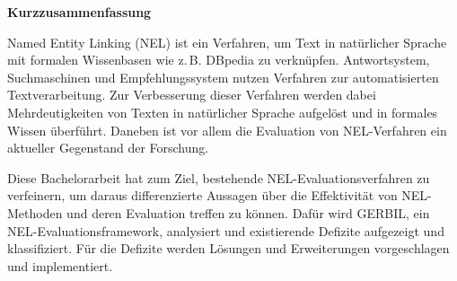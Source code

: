\documentclass[11pt, a4paper]{article}
\begin{document}
\begin{center}
{\bf Kurzzusammenfassung}
\end{center}
\noindent
Named Entity Linking (NEL) ist ein Verfahren, um Text in natürlicher Sprache mit formalen Wissenbasen wie z.\,B. DBpedia 
zu verknüpfen. Antwortsystem, Suchmaschinen und Empfehlungssystem nutzen Verfahren zur automatisierten Textverarbeitung.
Zur Verbesserung dieser Verfahren werden dabei Mehrdeutigkeiten von Texten in natürlicher Sprache aufgelöst und in formales
Wissen überführt.
Daneben ist vor allem die Evaluation von NEL-Verfahren ein aktueller Gegenstand der Forschung.

Diese Bachelorarbeit hat zum Ziel, bestehende NEL-Evaluationsverfahren zu verfeinern, um daraus differenzierte Aussagen über
die Effektivität von NEL-Methoden und deren Evaluation treffen zu können. Dafür wird GERBIL, ein NEL-Evaluationsframework, analysiert und
existierende Defizite aufgezeigt und klassifiziert. Für die Defizite werden Lösungen und Erweiterungen vorgeschlagen und implementiert.

\newpage

\tableofcontents 
\newpage

\newpage
\begin{appendix}


\listoffigures

\newpage
{}
\listoftables
\end{appendix}
\newpage

\setcounter{page}{1}
\setcounter{section}{0}
\renewcommand{\thesection}{\arabic{section}}
\newpage
 
\newpage

\newpage

\newpage

\newpage

\newpage


\newpage
\begin{appendix}
\setcounter{section}{4}
\renewcommand{\thesection}{\Alph{section}}

\end{appendix}

\newpage
{} %



\newpage

\newpage

\end{document}
